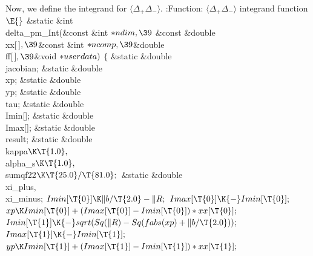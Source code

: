 \documentclass{cweb}
\begin{document}
Now, we define the integrand for $\langle \Delta_+ \Delta_- \rangle$.
\Y\B\4:Function: $\langle \Delta_+ \Delta_- \rangle$ integrand function%
\X${}\E{}$\6
\&{static} \&{int} \\{delta\_pm\_Int}(\&{const} \&{int} ${}{*}\\{ndim},\39{}$%
\&{const} \&{double} \\{xx}[\,]${},\39{}$\&{const} \&{int} ${}{*}\\{ncomp},%
\39{}$\&{double} \\{ff}[\,]${},\39{}$\&{void} ${}{*}\\{userdata}){}$\1\1\2\2\6
${}\{{}$\1\6
\&{static} \&{double} \\{jacobian};\6
\&{static} \&{double} \\{xp};\6
\&{static} \&{double} \\{yp};\6
\&{static} \&{double} \\{tau};\6
\&{static} \&{double} \\{Imin}[];\6
\&{static} \&{double} \\{Imax}[];\6
\&{static} \&{double} \\{result};\6
\&{static} \&{double} \\{kappa}${}\K\T{1.0},{}$ \\{alpha\_s}${}\K\T{1.0},{}$ %
\\{sumqf22}${}\K\T{25.0}/\T{81.0};{}$\6
\&{static} \&{double} \\{xi\_plus}${},{}$ \\{xi\_minus};\7
${}\\{Imin}[\T{0}]\K\|b/\T{2.0}-\|R;{}$\6
${}\\{Imax}[\T{0}]\K{-}\\{Imin}[\T{0}];{}$\6
${}\\{xp}\K\\{Imin}[\T{0}]+(\\{Imax}[\T{0}]-\\{Imin}[\T{0}])*\\{xx}[\T{0}];{}$\6
${}\\{Imin}[\T{1}]\K{-}\\{sqrt}(\\{Sq}(\|R)-\\{Sq}(\\{fabs}(\\{xp})+\|b/%
\T{2.0}));{}$\6
${}\\{Imax}[\T{1}]\K{-}\\{Imin}[\T{1}];{}$\6
${}\\{yp}\K\\{Imin}[\T{1}]+(\\{Imax}[\T{1}]-\\{Imin}[\T{1}])*\\{xx}[\T{1}];{}$\6
\end{document}

